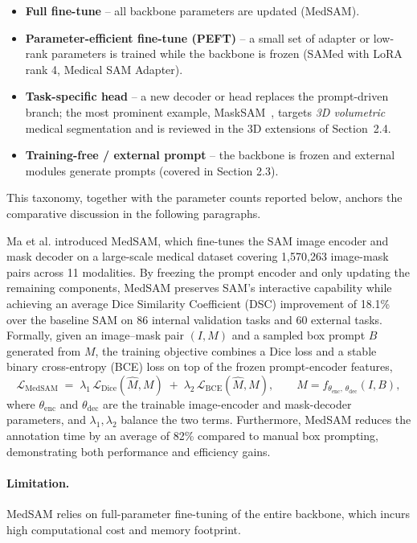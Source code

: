 \begin{itemize}
  \item \textbf{Full fine-tune} -- all backbone parameters are updated (MedSAM).
  \item \textbf{Parameter-efficient fine-tune (PEFT)} -- a small set of adapter or low-rank parameters is trained while the backbone is frozen (SAMed with LoRA rank 4, Medical SAM Adapter).
  \item \textbf{Task-specific head} -- a new decoder or head replaces the prompt-driven branch; the most prominent example, MaskSAM~\cite{cheng2024masksam}, targets \emph{3D volumetric} medical segmentation and is reviewed in the 3D extensions of Section~2.4.
  \item \textbf{Training-free / external prompt} -- the backbone is frozen and external modules generate prompts (covered in Section 2.3).
\end{itemize}

This taxonomy, together with the parameter counts reported below, anchors the comparative discussion in the following paragraphs.

Ma et al. \cite{ma2024medsam} introduced MedSAM, which fine-tunes the SAM image encoder and mask decoder on a large-scale medical dataset covering 1,570,263 image-mask pairs across 11 modalities. By freezing the prompt encoder and only updating the remaining components, MedSAM preserves SAM's interactive capability while achieving an average Dice Similarity Coefficient (DSC) improvement of 18.1\% over the baseline SAM on 86 internal validation tasks and 60 external tasks. Formally, given an image--mask pair $(I, M)$ and a sampled box prompt $B$ generated from $M$, the training objective combines a Dice loss and a stable binary cross-entropy (BCE) loss on top of the frozen prompt-encoder features,
\begin{equation}
  \mathcal{L}_{\mathrm{MedSAM}} \;=\; \lambda_{1}\,\mathcal{L}_{\mathrm{Dice}}(\hat{M}, M) \;+\; \lambda_{2}\,\mathcal{L}_{\mathrm{BCE}}(\hat{M}, M),\qquad
  \hat{M} = f_{\theta_{\mathrm{enc}},\, \theta_{\mathrm{dec}}}(I, B),
  \label{eq:medsam-loss}
\end{equation}
where $\theta_{\mathrm{enc}}$ and $\theta_{\mathrm{dec}}$ are the trainable image-encoder and mask-decoder parameters, and $\lambda_{1},\lambda_{2}$ balance the two terms. Furthermore, MedSAM reduces the annotation time by an average of 82\% compared to manual box prompting, demonstrating both performance and efficiency gains.

\paragraph{Limitation.} MedSAM relies on full-parameter fine-tuning of the entire backbone, which incurs high computational cost and memory footprint.

